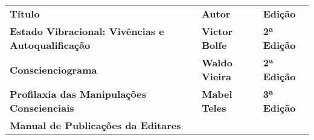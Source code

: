 \documentclass[
]{article}
\begin{document}
\begin{longtable}[]{@{}
  >{\raggedright\arraybackslash}p{}
  >{\raggedright\arraybackslash}p{}
  >{\raggedright\arraybackslash}p{}@{}}
\toprule\noalign{}
\begin{minipage}[b]{\linewidth}\centering
\textbf{Título}
\end{minipage} & \begin{minipage}[b]{\linewidth}\centering
\textbf{Autor}
\end{minipage} & \begin{minipage}[b]{\linewidth}\centering
\textbf{Edição}
\end{minipage} \\
\begin{minipage}[b]{\linewidth}\raggedright
\textbf{Estado Vibracional: Vivências e Autoqualificação}
\end{minipage} & \begin{minipage}[b]{\linewidth}\raggedright
\textbf{Victor Bolfe}
\end{minipage} & \begin{minipage}[b]{\linewidth}\raggedright
\textbf{2ª Edição}
\end{minipage} \\
\begin{minipage}[b]{\linewidth}\raggedright
\textbf{Conscienciograma}
\end{minipage} & \begin{minipage}[b]{\linewidth}\raggedright
\textbf{Waldo Vieira}
\end{minipage} & \begin{minipage}[b]{\linewidth}\raggedright
\textbf{2ª Edição}
\end{minipage} \\
\begin{minipage}[b]{\linewidth}\raggedright
\textbf{Profilaxia das Manipulações Conscienciais}
\end{minipage} & \begin{minipage}[b]{\linewidth}\raggedright
\textbf{Mabel Teles}
\end{minipage} & \begin{minipage}[b]{\linewidth}\raggedright
\textbf{3ª Edição}
\end{minipage} \\
\begin{minipage}[b]{\linewidth}\raggedright
\textbf{Manual de Publicações da Editares}

\end{minipage}
\end{longtable}
\end{document}
